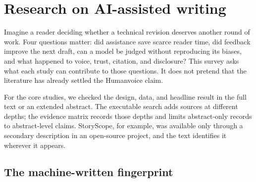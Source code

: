 \chapter{Research on AI-assisted writing}
\label{sec:literature}

Imagine a reader deciding whether a technical revision deserves another round
of work. Four questions matter: did assistance save scarce reader time, did
feedback improve the next draft, can a model be judged without reproducing its
biases, and what happened to voice, trust, citation, and disclosure? This
survey asks what each study can contribute to those questions. It does not
pretend that the literature has already settled the Humanvoice claim.

For the core studies, we checked the design, data, and headline result in the
full text or an extended abstract. The executable search adds sources at
different depths; the evidence matrix records those depths and limits
abstract-only records to abstract-level claims. StoryScope, for example, was
available only through a secondary description in an open-source project, and
the text identifies it wherever it appears.

\section{The machine-written fingerprint}
\label{sec:lit-fingerprint}

